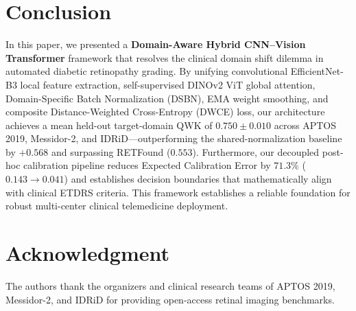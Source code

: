 \documentclass[conference]{IEEEtran}
\begin{document}
\section{Conclusion}
In this paper, we presented a \textbf{Domain-Aware Hybrid CNN--Vision Transformer} framework that resolves the clinical domain shift dilemma in automated diabetic retinopathy grading. By unifying convolutional EfficientNet-B3 local feature extraction, self-supervised DINOv2 ViT global attention, Domain-Specific Batch Normalization (DSBN), EMA weight smoothing, and composite Distance-Weighted Cross-Entropy (DWCE) loss, our architecture achieves a mean held-out target-domain QWK of $\mathbf{0.750 \pm 0.010}$ across APTOS 2019, Messidor-2, and IDRiD---outperforming the shared-normalization baseline by $+0.568$ and surpassing RETFound ($0.553$). Furthermore, our decoupled post-hoc calibration pipeline reduces Expected Calibration Error by $71.3\%$ ($0.143 \rightarrow 0.041$) and establishes decision boundaries that mathematically align with clinical ETDRS criteria. This framework establishes a reliable foundation for robust multi-center clinical telemedicine deployment.

\section*{Acknowledgment}
The authors thank the organizers and clinical research teams of APTOS 2019, Messidor-2, and IDRiD for providing open-access retinal imaging benchmarks.



\end{document}
